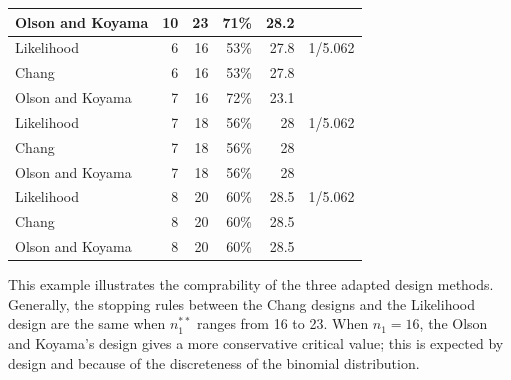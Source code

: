 \documentclass[12pt]{report}\usepackage[]{graphicx}\usepackage[]{color}
\newlength{\li}\setlength{\li}{14.48pt}
\newlength{\di}\setlength{\di}{-3.5mm}
\begin{document}
\begin{table}[]
\begin{tabular}{|L|R|R|R|R|L|}
Olson and Koyama & 10    & 23    & 71\%           & 28.2          &                                                                                    \\ \hline
Likelihood       & 6     & 16    & 53\%           & 27.8          & 1/5.062                                                                            \\ \hline
Chang            & 6     & 16    & 53\%           & 27.8          &                                                                                    \\ \hline
Olson and Koyama & 7     & 16    & 72\%           & 23.1          &                                                                                    \\ \hline
Likelihood       & 7     & 18    & 56\%           & 28            & 1/5.062                                                                            \\ \hline
Chang            & 7     & 18    & 56\%           & 28            &                                                                                    \\ \hline
Olson and Koyama & 7     & 18    & 56\%           & 28            &                                                                                    \\ \hline
Likelihood       & 8     & 20    & 60\%           & 28.5          & 1/5.062                                                                            \\ \hline
Chang            & 8     & 20    & 60\%           & 28.5          &                                                                                    \\ \hline
Olson and Koyama & 8     & 20    & 60\%           & 28.5          &                                                                                    \\ \hline
\end{tabular}
\hspace*{-0.1cm}
\end{table}

This example illustrates the comprability of the three adapted design methods. Generally, the stopping rules between the Chang designs and the Likelihood design are the same when $n_1^{\ast\ast}$ ranges from 16 to 23. When $n_1 = 16$, the Olson and Koyama's design gives a more conservative critical value; this is expected by design and because of the discreteness of the binomial distribution. 
\end{document}

